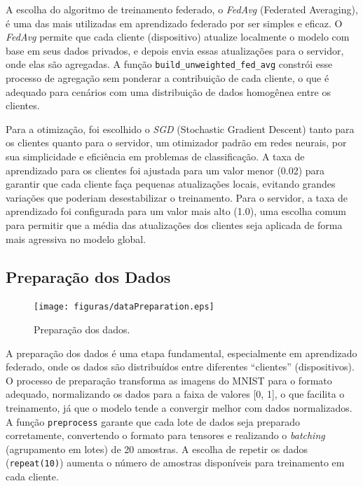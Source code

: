 A escolha do algoritmo de treinamento federado, o \textit{FedAvg} (Federated Averaging), é uma das mais utilizadas em aprendizado federado por ser simples e eficaz. O \textit{FedAvg} permite que cada cliente (dispositivo) atualize localmente o modelo com base em seus dados privados, e depois envia essas atualizações para o servidor, onde elas são agregadas. A função \texttt{build\_unweighted\_fed\_avg} constrói esse processo de agregação sem ponderar a contribuição de cada cliente, o que é adequado para cenários com uma distribuição de dados homogênea entre os clientes. 

Para a otimização, foi escolhido o \textit{SGD} (Stochastic Gradient Descent) tanto para os clientes quanto para o servidor, um otimizador padrão em redes neurais, por sua simplicidade e eficiência em problemas de classificação. A taxa de aprendizado para os clientes foi ajustada para um valor menor (0.02) para garantir que cada cliente faça pequenas atualizações locais, evitando grandes variações que poderiam desestabilizar o treinamento. Para o servidor, a taxa de aprendizado foi configurada para um valor mais alto (1.0), uma escolha comum para permitir que a média das atualizações dos clientes seja aplicada de forma mais agressiva no modelo global.

\subsection{Preparação dos Dados}

\begin{figure}[ht]
    \centering
    \texttt{[image: figuras/dataPreparation.eps]}
    \caption{Preparação dos dados.}
    \label{fig:dataPreparation}
\end{figure}

A preparação dos dados é uma etapa fundamental, especialmente em aprendizado federado, onde os dados são distribuídos entre diferentes ``clientes'' (dispositivos). O processo de preparação transforma as imagens do MNIST para o formato adequado, normalizando os dados para a faixa de valores [0, 1], o que facilita o treinamento, já que o modelo tende a convergir melhor com dados normalizados. A função \texttt{preprocess} garante que cada lote de dados seja preparado corretamente, convertendo o formato para tensores e realizando o \textit{batching} (agrupamento em lotes) de 20 amostras. A escolha de repetir os dados (\texttt{repeat(10)}) aumenta o número de amostras disponíveis para treinamento em cada cliente. 


